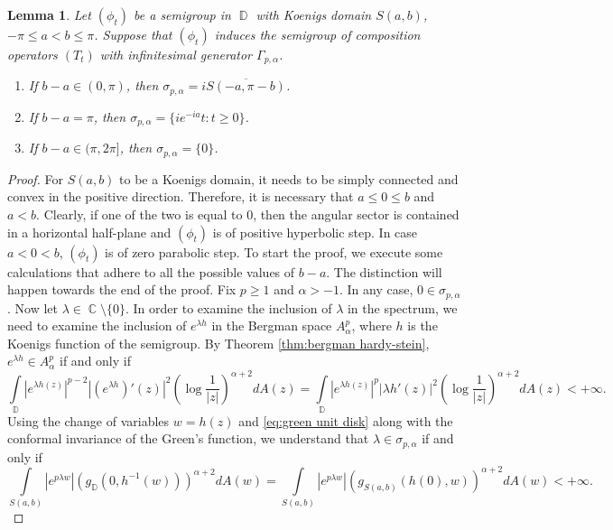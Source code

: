 \documentclass[11pt]{amsart}
\numberwithin{equation}{section}
\newtheorem{lemma}[theorem]{Lemma}
\theoremstyle{definition}
\DeclareMathOperator{\C}{\mathbb{C}}
\DeclareMathOperator{\D}{\mathbb{D}}
\begin{document}
	\begin{lemma}\label{lm:bergman sector}
		Let $(\phi_t)$ be a semigroup in $\D$ with Koenigs domain $S(a,b)$, $-\pi\le a<b \le \pi$. Suppose that $(\phi_t)$ induces the semigroup of composition operators $(T_t)$ with infinitesimal generator $\Gamma_{p,\alpha}$.
		\begin{enumerate}
			\item[\textup{(a)}] If $b-a\in (0,\pi)$, then $\sigma_{p,\alpha}=i\overline{S(-a,\pi-b)}$.
			\item[\textup{(b)}] If $b-a=\pi$, then $\sigma_{p,\alpha}=\{ie^{-ia}t:t\ge0\}$.
			\item[\textup{(c)}] If $b-a \in(\pi,2\pi]$, then $\sigma_{p,\alpha}=\{0\}$.
		\end{enumerate}
	\end{lemma}
	\begin{proof}
		For $S(a,b)$ to be a Koenigs domain, it needs to be simply connected and convex in the positive direction. Therefore, it is necessary that $a\le 0\le b$ and $a<b$. Clearly, if one of the two is equal to $0$, then the angular sector is contained in a horizontal half-plane and $(\phi_t)$ is of positive hyperbolic step. In case $a<0<b$, $(\phi_t)$ is of zero parabolic step. To start the proof, we execute some calculations that adhere to all the possible values of $b-a$. The distinction will happen towards the end of the proof. Fix $p\ge1$ and $\alpha>-1$. In any case, $0\in\sigma_{p,\alpha}$. Now let $\lambda\in\C\setminus\{0\}$. In order to examine the inclusion of $\lambda$ in the spectrum, we need to examine the inclusion of $e^{\lambda h}$ in the Bergman space $A_\alpha^p$, where $h$ is the Koenigs function of the semigroup. By Theorem \ref{thm:bergman hardy-stein}, $e^{\lambda h}\in A_\alpha^p$ if and only if
		\begin{equation}\label{eq:bergman main 1}
			\int\limits_{\D}\left|e^{\lambda h(z)}\right|^{p-2}\left|\left(e^{\lambda h}\right)'(z)\right|^2\left(\log\frac{1}{|z|}\right)^{\alpha+2}dA(z)=\int\limits_{\D}\left|e^{\lambda h(z)}\right|^p|\lambda h'(z)|^2\left(\log\frac{1}{|z|}\right)^{\alpha+2}dA(z)<+\infty.
		\end{equation}
		Using the change of variables $w=h(z)$ and \eqref{eq:green unit disk} along with the conformal invariance of the Green's function, we understand that $\lambda\in\sigma_{p,\alpha}$ if and only if 
		\begin{equation}\label{eq:bergman main 2}
			\int\limits_{S(a,b)}\left|e^{p\lambda w}\right|(g_{\D}(0,h^{-1}(w)))^{\alpha+2}dA(w)=\int\limits_{S(a,b)}\left|e^{p\lambda w}\right|(g_{S(a,b)}(h(0),w))^{\alpha+2}dA(w)<+\infty.

\end{equation}
\end{proof}
\end{document}
